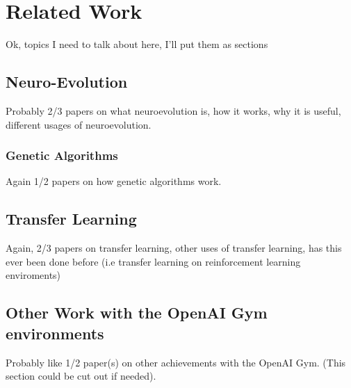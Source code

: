 \chapter{Related Work}

\label{ch:background}


Ok, topics I need to talk about here, I'll put them as sections

\section{Neuro-Evolution}

Probably 2/3 papers on what neuroevolution is, how it works, why it is useful, different usages of neuroevolution.

\subsection{Genetic Algorithms}

Again 1/2 papers on how genetic algorithms work.


\section{Transfer Learning}

Again, 2/3 papers on transfer learning, other uses of transfer learning, has this ever been done before (i.e transfer learning on reinforcement learning enviroments)

\section{Other Work with the OpenAI Gym environments}

Probably like 1/2 paper(s) on other achievements with the OpenAI Gym. (This section could be cut out if needed).
